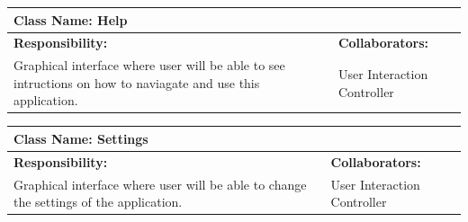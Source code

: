 \documentclass[]{article}
\begin{document}
	\begin{table}[ht]
		\centering
		\begin{tabular}{|p{5cm}|p{5cm}|}
		\hline 
		 \multicolumn{2}{|l|}{\textbf{Class Name: Help}} \\
		\hline
		\textbf{Responsibility:} & \textbf{Collaborators:} \\
		\hline
		Graphical interface where user will be able to see intructions on how to naviagate and use this application. \vspace{1in} & User Interaction Controller\\
		\hline
		\end{tabular}
	\end{table}

	\begin{table}[ht]
		\centering
		\begin{tabular}{|p{5cm}|p{5cm}|}
		\hline 
		 \multicolumn{2}{|l|}{\textbf{Class Name: Settings}} \\
		\hline
		\textbf{Responsibility:} & \textbf{Collaborators:} \\
		\hline
		Graphical interface where user will be able to change the settings of the application. \vspace{1in} & User Interaction Controller \\
		\hline
		\end{tabular}
	\end{table}

\end{document}
